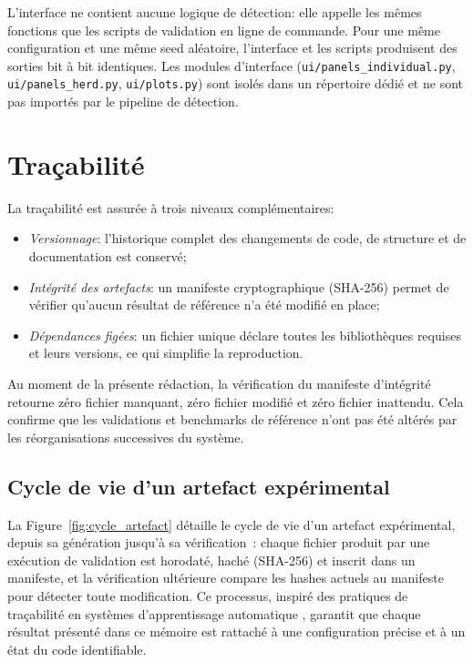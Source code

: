 L'interface ne contient aucune logique de détection: elle appelle les mêmes fonctions
que les scripts de validation en ligne de commande. Pour une même configuration et une
même seed aléatoire, l'interface et les scripts produisent des sorties bit à bit
identiques. Les modules d'interface (\texttt{ui/panels\_individual.py},
\texttt{ui/panels\_herd.py}, \texttt{ui/plots.py}) sont isolés dans un répertoire
dédié et ne sont pas importés par le pipeline de détection.

\FloatBarrier
\section{Traçabilité}

La traçabilité est assurée à trois niveaux complémentaires:

\begin{itemize}
    \item \textit{Versionnage}: l'historique complet des changements de code, de structure
    et de documentation est conservé;
    \item \textit{Intégrité des artefacts}: un manifeste cryptographique (SHA-256) permet de
    vérifier qu'aucun résultat de référence n'a été modifié en place;
    \item \textit{Dépendances figées}: un fichier unique déclare toutes les bibliothèques
    requises et leurs versions, ce qui simplifie la reproduction.
\end{itemize}

Au moment de la présente rédaction, la vérification du manifeste d'intégrité retourne
zéro fichier manquant, zéro fichier modifié et zéro fichier inattendu. Cela confirme
que les validations et benchmarks de référence n'ont pas été altérés par les
réorganisations successives du système.

\subsection{Cycle de vie d'un artefact expérimental}

La Figure~\ref{fig:cycle_artefact} détaille le cycle de vie d'un artefact expérimental,
depuis sa génération jusqu'à sa vérification~: chaque fichier produit par une exécution de
validation est horodaté, haché (SHA-256) et inscrit dans un manifeste, et la
vérification ultérieure compare les hashes actuels au manifeste pour détecter toute
modification. Ce processus, inspiré des pratiques de traçabilité en systèmes d'apprentissage automatique
\citep{sculley2015hidden}, garantit que chaque résultat présenté dans ce mémoire est
rattaché à une configuration précise et à un état du code identifiable.

